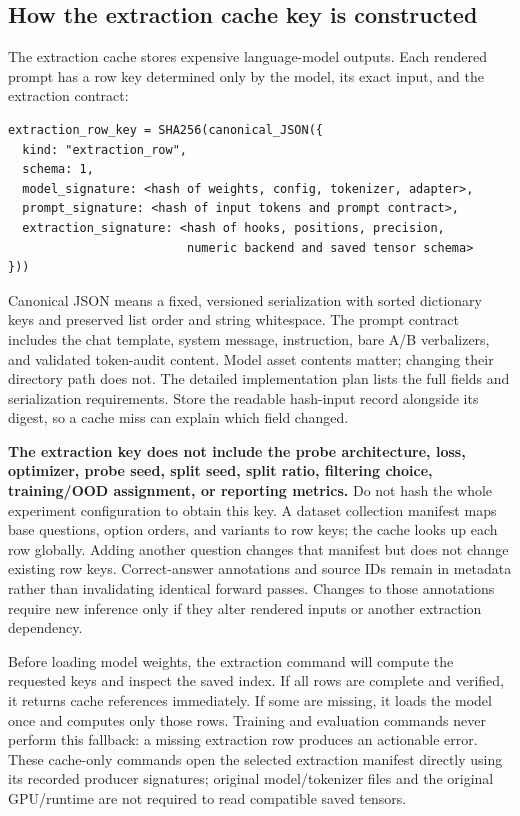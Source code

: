\documentclass[11pt]{article}
\begin{document}
\subsection*{How the extraction cache key is constructed}

The extraction cache stores expensive language-model outputs.
Each rendered prompt has a row key determined only by the model, its exact input, and the extraction contract:
\begin{verbatim}
extraction_row_key = SHA256(canonical_JSON({
  kind: "extraction_row",
  schema: 1,
  model_signature: <hash of weights, config, tokenizer, adapter>,
  prompt_signature: <hash of input tokens and prompt contract>,
  extraction_signature: <hash of hooks, positions, precision,
                         numeric backend and saved tensor schema>
}))
\end{verbatim}
Canonical JSON means a fixed, versioned serialization with sorted dictionary keys and preserved list order and string whitespace.
The prompt contract includes the chat template, system message, instruction, bare A/B verbalizers, and validated token-audit content.
Model asset contents matter; changing their directory path does not.
The detailed implementation plan lists the full fields and serialization requirements.
Store the readable hash-input record alongside its digest, so a cache miss can explain which field changed.

\textbf{The extraction key does not include the probe architecture, loss, optimizer, probe seed, split seed, split ratio, filtering choice, training/OOD assignment, or reporting metrics.}
Do not hash the whole experiment configuration to obtain this key.
A dataset collection manifest maps base questions, option orders, and variants to row keys; the cache looks up each row globally.
Adding another question changes that manifest but does not change existing row keys.
Correct-answer annotations and source IDs remain in metadata rather than invalidating identical forward passes.
Changes to those annotations require new inference only if they alter rendered inputs or another extraction dependency.

Before loading model weights, the extraction command will compute the requested keys and inspect the saved index.
If all rows are complete and verified, it returns cache references immediately.
If some are missing, it loads the model once and computes only those rows.
Training and evaluation commands never perform this fallback: a missing extraction row produces an actionable error.
These cache-only commands open the selected extraction manifest directly using its recorded producer signatures; original model/tokenizer files and the original GPU/runtime are not required to read compatible saved tensors.
\end{document}
